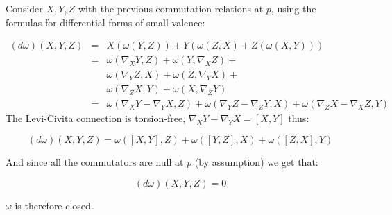\documentclass[12pt]{article}
\begin{document}
\begin{itemize}
Consider $X,Y,Z$ with the previous commutation relations at $p$, using the formulas for differential forms of small valence:

\begin{eqnarray}
(d \omega)(X,Y,Z) &=& X(\omega(Y,Z)) + Y(\omega(Z,X) + Z(\omega(X,Y)) ) \nonumber \\
        &=& \omega(\nabla_X Y,Z) + \omega(Y,\nabla_X Z) + \nonumber \\
        &&  \omega(\nabla_Y Z,X) + \omega(Z,\nabla_Y X) + \nonumber \\
        && \omega(\nabla_Z X,Y) + \omega(X,\nabla_Z Y) \nonumber \\
        &=& \omega(\nabla_X Y - \nabla_Y X, Z) + \omega(\nabla_Y Z - \nabla_Z Y, X) + \omega(\nabla_Z X - \nabla_X Z, Y) \nonumber
\end{eqnarray}
The Levi-Civita connection is torsion-free, $\nabla_X Y - \nabla_Y X = [X,Y]$ thus:

$$(d \omega)(X,Y,Z) = \omega([X,Y],Z) + \omega([Y,Z],X) + \omega([Z,X],Y)$$

And since all the commutators are null at $p$ (by assumption) we get that:

$$ (d \omega)(X,Y,Z) = 0 $$

$\omega$ is therefore closed.

\end{itemize}

\end{document}
